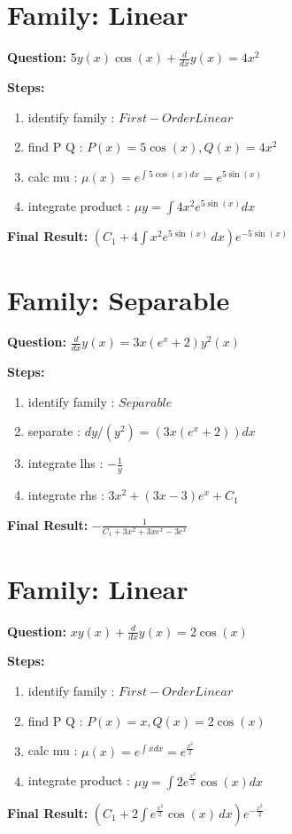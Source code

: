 \documentclass{article}
\begin{document}
\section*{Family: Linear}
\textbf{Question:} $5 y{\left(x \right)} \cos{\left(x \right)} + \frac{d}{d x} y{\left(x \right)} = 4 x^{2}$

\textbf{Steps:}
\begin{enumerate}
\item identify family :  $First-Order Linear$
\item find P Q :  $P(x)=5 \cos{\left(x \right)}, Q(x)=4 x^{2}$
\item calc mu :  $\mu(x) = e^{\int 5 \cos{\left(x \right)} dx} = e^{5 \sin{\left(x \right)}}$
\item integrate product :  $\mu y = \int 4 x^{2} e^{5 \sin{\left(x \right)}} dx$
\end{enumerate}
\textbf{Final Result:} $\left(C_{1} + 4 \int x^{2} e^{5 \sin{\left(x \right)}}\, dx\right) e^{- 5 \sin{\left(x \right)}}$

\section*{Family: Separable}
\textbf{Question:} $\frac{d}{d x} y{\left(x \right)} = 3 x \left(e^{x} + 2\right) y^{2}{\left(x \right)}$

\textbf{Steps:}
\begin{enumerate}
\item identify family :  $Separable$
\item separate :  $dy / (y^{2}) = (3 x \left(e^{x} + 2\right)) dx$
\item integrate lhs :  $- \frac{1}{y}$
\item integrate rhs :  $3 x^{2} + \left(3 x - 3\right) e^{x} + C_1$
\end{enumerate}
\textbf{Final Result:} $- \frac{1}{C_{1} + 3 x^{2} + 3 x e^{x} - 3 e^{x}}$

\section*{Family: Linear}
\textbf{Question:} $x y{\left(x \right)} + \frac{d}{d x} y{\left(x \right)} = 2 \cos{\left(x \right)}$

\textbf{Steps:}
\begin{enumerate}
\item identify family :  $First-Order Linear$
\item find P Q :  $P(x)=x, Q(x)=2 \cos{\left(x \right)}$
\item calc mu :  $\mu(x) = e^{\int x dx} = e^{\frac{x^{2}}{2}}$
\item integrate product :  $\mu y = \int 2 e^{\frac{x^{2}}{2}} \cos{\left(x \right)} dx$
\end{enumerate}
\textbf{Final Result:} $\left(C_{1} + 2 \int e^{\frac{x^{2}}{2}} \cos{\left(x \right)}\, dx\right) e^{- \frac{x^{2}}{2}}$
\end{document}
